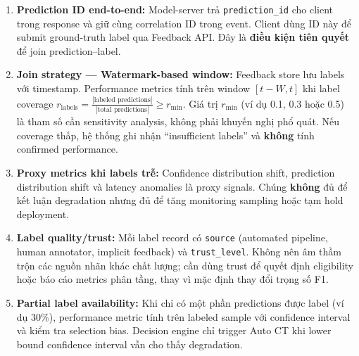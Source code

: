 \documentclass[11pt,a4paper]{article}
\newcommand{\codepath}[1]{\texttt{\small #1}}
\begin{document}
\begin{enumerate}
  \item \textbf{Prediction ID end-to-end:} Model-server trả \codepath{prediction\_id} cho client trong response và giữ cùng correlation ID trong event. Client dùng ID này để submit ground-truth label qua Feedback API. Đây là \textbf{điều kiện tiên quyết} để join prediction--label.

  \item \textbf{Join strategy --- Watermark-based window:} Feedback store lưu labels với timestamp. Performance metrics tính trên window $[t-W, t]$ khi label coverage $r_\text{labels} = \frac{|\text{labeled predictions}|}{|\text{total predictions}|} \ge r_\text{min}$. Giá trị $r_\text{min}$ (ví dụ 0.1, 0.3 hoặc 0.5) là tham số cần sensitivity analysis, không phải khuyến nghị phổ quát. Nếu coverage thấp, hệ thống ghi nhận ``insufficient labels'' và \textbf{không} tính confirmed performance.

  \item \textbf{Proxy metrics khi labels trễ:} Confidence distribution shift, prediction distribution shift và latency anomalies là proxy signals. Chúng \textbf{không} đủ để kết luận degradation nhưng đủ để tăng monitoring sampling hoặc tạm hold deployment.

  \item \textbf{Label quality/trust:} Mỗi label record có \codepath{source} (automated pipeline, human annotator, implicit feedback) và \codepath{trust\_level}. Không nên âm thầm trộn các nguồn nhãn khác chất lượng; cần dùng trust để quyết định eligibility hoặc báo cáo metrics phân tầng, thay vì mặc định thay đổi trọng số F1.

  \item \textbf{Partial label availability:} Khi chỉ có một phần predictions được label (ví dụ 30\%), performance metric tính trên labeled sample với confidence interval và kiểm tra selection bias. Decision engine chỉ trigger Auto CT khi lower bound confidence interval vẫn cho thấy degradation.
\end{enumerate}
\end{document}

